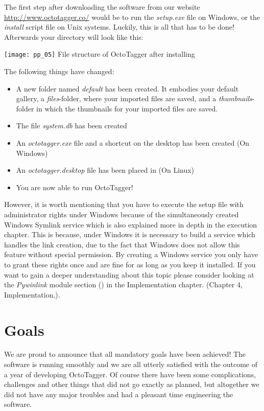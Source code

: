The first step after downloading the software from our website \url{http://www.octotagger.co/} would be to run the \textit{setup.exe} file on Windows, or the \emph{install} script file on Unix systems. Luckily, this is all that has to be done! Afterwards your directory will look like this:

\begin{center}
\texttt{[image: pp\_05]}
\small{File structure of OctoTagger after installing}
\end{center}


The following things have changed:
\begin{itemize}
	\item A new folder named \emph{default} has been created. It embodies your default gallery, a \emph{files}-folder, where your imported files are saved, and a \emph{thumbnails}-folder in which the thumbnails for your imported files are saved.
	\item The file \textit{system.db} has been created
	\item An \emph{octotagger.exe} file and a shortcut on the desktop has been created (On Windows)
	\item An \emph{octotagger.desktop} file has been placed in  (On Linux) 
	\item You are now able to run OctoTagger!
\end{itemize}

However, it is worth mentioning that you have to execute the setup file with administrator rights under Windows because of the simultaneously created Windows Symlink service which is also explained more in depth in the execution chapter. This is because, under Windows it is necessary to build a service which handles the link creation, due to the fact that Windows does not allow this feature without special permission. By creating a Windows service you only have to grant these rights once and are fine for as long as you keep it installed. If you want to gain a deeper understanding about this topic please consider looking at the \textit{Pywinlink} module section () in the Implementation chapter. (Chapter 4, Implementation,). %

\section{Goals}
We are proud to announce that all mandatory goals have been achieved! The software is running smoothly and we are all utterly satisfied with the outcome of a year of developing OctoTagger. Of course there have been some complications, challenges and other things that did not go exactly as planned, but altogether we did not have any major troubles and had a pleasant time engineering the software.

